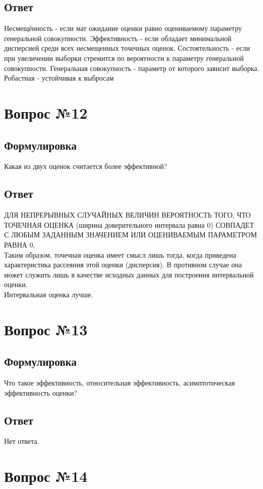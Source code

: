 \documentclass[a4]{article}
\begin{document}
	\subsection*{Ответ}
	Несмещённость - если мат ожидание оценки равно оцениваемому параметру генеральной совокупности. Эффективность - если обладает минимальной дисперсией среди всех несмещенных точечных оценок. Состоятельность - если при увеличении выборки стремится по вероятности к параметру генеральной совокупности. Генеральная совокупность - параметр от которого зависит выборка. Робастная - устойчивая к выбросам
	
	\section{Вопрос №12}
	\subsection*{Формулировка}
	Какая из двух оценок считается более эффективной?
	\subsection*{Ответ}
	ДЛЯ НЕПРЕРЫВНЫХ СЛУЧАЙНЫХ ВЕЛИЧИН ВЕРОЯТНОСТЬ ТОГО, ЧТО ТОЧЕЧНАЯ ОЦЕНКА (ширина доверительного интервала равна 0) СОВПАДЕТ С ЛЮБЫМ ЗАДАННЫМ ЗНАЧЕНИЕМ ИЛИ ОЦЕНИВАЕМЫМ ПАРАМЕТРОМ РАВНА 0.\\
	Таким образом, точечная оценка имеет смысл лишь тогда, когда приведена характеристика рассеяния этой оценки (дисперсия). В противном случае она может служить лишь в качестве исходных данных для построения интервальной оценки.\\
	Интервальная оценка лучше.
	
	\section{Вопрос №13}
	\subsection*{Формулировка}
	Что такое эффективность, относительная эффективность, асимптотическая эффективность оценки?
	\subsection*{Ответ}
	Нет ответа.
	
	\section{Вопрос №14}
\end{document}
